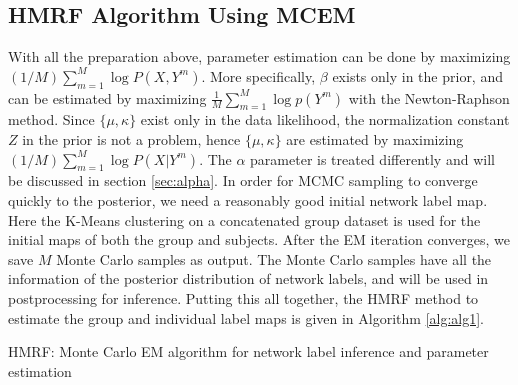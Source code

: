 \documentclass[review,authoryear]{elsarticle}
\begin{document}
\subsection{HMRF Algorithm Using MCEM}
With all the preparation above, parameter estimation can be done by maximizing
$(1/M)\sum_{m=1}^M\log P (X, Y^m)$. More specifically, $\beta$ exists only
in the prior, and can be estimated by maximizing $\frac{1}{M}\sum_{m=1}^M\log p
(Y^m)$ with the Newton-Raphson method. Since $\{\mu, \kappa\}$ exist only in the
data likelihood, the normalization constant $Z$ in the prior is not a problem,
hence $\{\mu, \kappa\}$ are estimated by maximizing $(1/M)\sum_{m=1}^M
\log P(X|Y^m)$. The $\alpha$ parameter is treated differently and will be
discussed in section \ref{sec:alpha}. In order for MCMC sampling to converge
quickly to the posterior, we need a reasonably good initial network label
map. Here the K-Means clustering on a concatenated group dataset is used for the
initial maps of both the group and subjects. After the EM iteration converges,
we save $M$ Monte Carlo samples as output. The Monte Carlo samples have all the
information of the posterior distribution of network labels, and will be used in
postprocessing for inference. Putting this all together, the HMRF method to
estimate the group and individual label maps is given in Algorithm
\ref{alg:alg1}.

\begin{algorithm}
  \caption{HMRF: Monte Carlo EM algorithm for network label inference and parameter estimation}
  \label{alg:alg1}
\end{algorithm}
\end{document}
